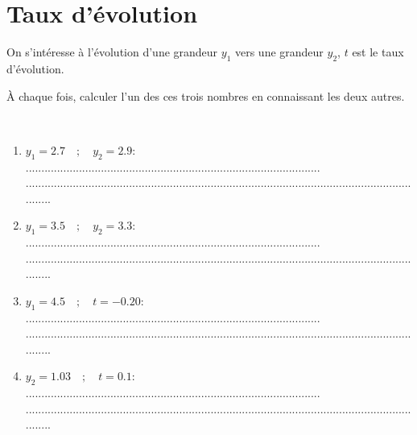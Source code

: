 \section{Taux d'évolution}
On s'intéresse à l'évolution d'une grandeur $y_1$ vers une grandeur $y_2$, $t$ est le taux d'évolution.

\`A chaque fois, calculer l'un des ces trois nombres en connaissant les deux autres.

\begin{questions}
	\question[4] \ 
	\begin{enumerate}[label=\alph*)]
		
		\item $y_1 = \num{2.7} \quad ; \quad y_2=\num{2.9} $:  ..............................................................................................\\
		...................................................................................................................................
		\item $y_1 = \num{3.5} \quad ; \quad y_2=\num{3.3} $:  ..............................................................................................\\
		...................................................................................................................................
		\item $y_1 = \num{4.5} \quad ; \quad t=\num{-0.20} $:   ..............................................................................................\\
		...................................................................................................................................
		\item $y_2 = \num{1.03} \quad ; \quad t=\num{0.1} $:  ..............................................................................................\\
		...................................................................................................................................
		\end{enumerate}
\end{questions}